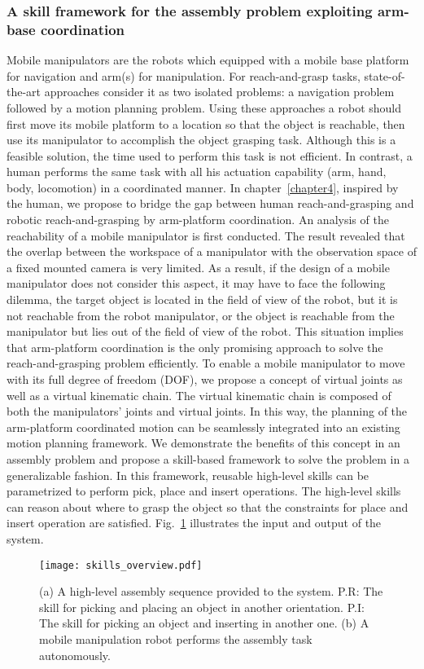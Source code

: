 \subsubsection{A skill framework for the assembly problem exploiting arm-base coordination}
Mobile manipulators are the robots which equipped with a mobile base platform for navigation and arm(s) for manipulation. For reach-and-grasp tasks, state-of-the-art approaches consider it as two isolated problems: a navigation problem followed by a motion planning problem. Using these approaches a robot should first move its mobile platform to a location so that the object is reachable, then use its manipulator to accomplish the object grasping task. Although this is a feasible solution, the time used to perform this task is not efficient. In contrast, a human performs the same task with all his actuation capability (arm, hand, body, locomotion) in a coordinated manner. In chapter~\ref{chapter4}, inspired by the human, we propose to bridge the gap between human reach-and-grasping and robotic reach-and-grasping by arm-platform coordination. An analysis of the reachability of a mobile manipulator is first conducted. The result revealed that the overlap between the workspace of a manipulator with the observation space of a fixed mounted camera is very limited. As a result, if the design of a mobile manipulator does not consider this aspect, it may have to face the following dilemma, the target object is located in the field of view of the robot, but it is not reachable from the robot manipulator, or the object is reachable from the manipulator but lies out of the field of view of the robot. This situation implies that arm-platform coordination is the only promising approach to solve the reach-and-grasping problem efficiently. To enable a mobile manipulator to move with its full degree of freedom (DOF), we propose a concept of virtual joints as well as a virtual kinematic chain. The virtual kinematic chain is composed of both the manipulators' joints and virtual joints. In this way, the planning of the arm-platform coordinated motion can be seamlessly integrated into an existing motion planning framework. We demonstrate the benefits of this concept in an assembly problem and propose a skill-based framework to solve the problem in a generalizable fashion. In this framework, reusable high-level skills can be parametrized to perform pick, place and insert operations. The high-level skills can reason about where to grasp the object so that the constraints for place and insert operation are satisfied. Fig.~\ref{fig:skill_over_view} illustrates the input and output of the system.
\begin{figure}[!htbp]
\centering
\texttt{[image: skills\_overview.pdf]}
\captionsetup{justification=raggedright}
\caption{(a) A high-level assembly sequence provided to the system. P.R: The skill for picking and placing an object in another orientation. P.I: The skill for picking an object and inserting in another one. (b) A mobile manipulation robot performs the assembly task autonomously.}
\label{fig:skill_over_view}
\end{figure} 

